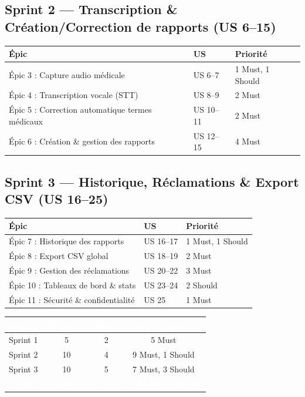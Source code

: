 \documentclass[12pt,a4paper]{article}
\begin{document}
\subsection*{Sprint 2 — Transcription \& Création/Correction de rapports (US 6–15)}
\begin{tabular}{|l|l|l|}
\hline
\rowcolor{sprint2bg}
\textcolor{sprint2txt}{\textbf{Épic}} & \textcolor{sprint2txt}{\textbf{US}} & \textcolor{sprint2txt}{\textbf{Priorité}} \\ \hline
Épic 3 : Capture audio médicale                   & US 6–7   & 1 Must, 1 Should \\ \hline
Épic 4 : Transcription vocale (STT)               & US 8–9   & 2 Must \\ \hline
Épic 5 : Correction automatique termes médicaux   & US 10–11 & 2 Must \\ \hline
Épic 6 : Création \& gestion des rapports         & US 12–15 & 4 Must \\ \hline
\end{tabular}

\vspace{0.5cm}
\subsection*{Sprint 3 — Historique, Réclamations \& Export CSV (US 16–25)}
\begin{tabular}{|l|l|l|}
\hline
\rowcolor{sprint3bg}
\textcolor{sprint3txt}{\textbf{Épic}} & \textcolor{sprint3txt}{\textbf{US}} & \textcolor{sprint3txt}{\textbf{Priorité}} \\ \hline
Épic 7  : Historique des rapports         & US 16–17 & 1 Must, 1 Should \\ \hline
Épic 8  : Export CSV global               & US 18–19 & 2 Must \\ \hline
Épic 9  : Gestion des réclamations        & US 20–22 & 3 Must \\ \hline
Épic 10 : Tableaux de bord \& stats       & US 23–24 & 2 Should \\ \hline
Épic 11 : Sécurité \& confidentialité     & US 25    & 1 Must \\ \hline
\end{tabular}

\vspace{1cm}
\begin{center}
\begin{tabular}{|c|c|c|c|}
\hline
\rowcolor{headercolor}
\textcolor{white}{\textbf{Sprint}} & \textcolor{white}{\textbf{Nb de US}} & \textcolor{white}{\textbf{Épics}} & \textcolor{white}{\textbf{Must / Should}} \\ \hline
Sprint 1 &  5 & 2 & 5 Must \\ \hline
Sprint 2 & 10 & 4 & 9 Must, 1 Should \\ \hline
Sprint 3 & 10 & 5 & 7 Must, 3 Should \\ \hline
\rowcolor{headercolor}
\textcolor{white}{\textbf{Total}} & \textcolor{white}{\textbf{25}} & \textcolor{white}{\textbf{11}} & \textcolor{white}{\textbf{21 Must, 4 Should}} \\ \hline
\end{tabular}
\end{center}
\end{document}
